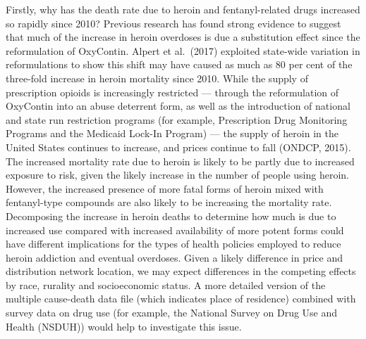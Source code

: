 \documentclass[12pt, a4paper]{article}
\begin{document}
Firstly, why has the death rate due to heroin and fentanyl-related drugs increased so rapidly since 2010? Previous research has found strong evidence to suggest that much of the increase in heroin overdoses is due a substitution effect since the reformulation of OxyContin. Alpert et al.\ (2017) exploited state-wide variation in reformulations to show this shift may have caused as much as 80 per cent of the three-fold increase in heroin mortality since 2010. While the supply of prescription opioids is increasingly restricted --- through the reformulation of OxyContin into an abuse deterrent form, as well as the introduction of national and state run restriction programs (for example, Prescription Drug Monitoring Programs and the Medicaid Lock-In Program) --- the supply of heroin in the United States continues to increase, and prices continue to fall (ONDCP, 2015). The increased mortality rate due to heroin is likely to be partly due to increased exposure to risk, given the likely increase in the number of people using heroin. However, the increased presence of more fatal forms of heroin mixed with fentanyl-type compounds are also likely to be increasing the mortality rate. Decomposing the increase in heroin deaths to determine how much is due to increased use compared with increased availability of more potent forms could have different implications for the types of health policies employed to reduce heroin addiction and eventual overdoses. Given a likely difference in price and distribution network location, we may expect differences in the competing effects by race, rurality and socioeconomic status. A more detailed version of the multiple cause-death data file (which indicates place of residence) combined with survey data on drug use (for example, the National Survey on Drug Use and Health (NSDUH)) would help to investigate this issue. 
\end{document}
